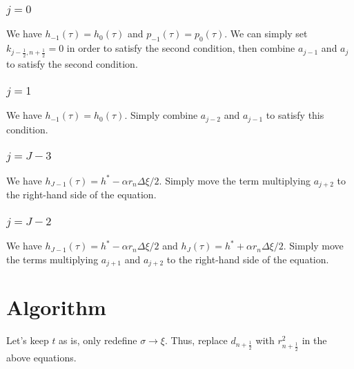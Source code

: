 \documentclass[12pt]{article}
\numberwithin{equation}{section}
\begin{document}
\subsubsection{$j=0$}

We have $h_{-1}(\tau) = h_{0}(\tau)$ and $p_{-1}(\tau) = p_0(\tau)$. We can simply set $k_{j-\frac{1}{2},n+\frac{1}{2}} = 0$  in order to satisfy the second condition, then combine $a_{j-1}$ and $a_j$ to satisfy the second condition.


\subsubsection{$j=1$}

We have $h_{-1}(\tau) = h_{0}(\tau)$. Simply combine $a_{j-2}$ and $a_{j-1}$ to satisfy this condition.

\subsubsection{$j=J-3$}

We have $h_{J-1}(\tau) = h^* - \alpha r_n \Delta \xi / 2$. Simply move the term multiplying $a_{j+2}$ to the right-hand side of the equation.


\subsubsection{$j=J-2$}


We have $h_{J-1}(\tau) = h^* - \alpha r_n \Delta \xi / 2$ and $h_{J}(\tau) = h^* + \alpha r_n \Delta \xi / 2$. Simply move the terms multiplying $a_{j+1}$ and $a_{j+2}$ to the right-hand side of the equation.


\pagebreak

\section{Algorithm}

Let's keep $t$ as is, only redefine $\sigma \rightarrow \xi$. Thus, replace $d_{n+\frac{1}{2}}$ with $r_{n+\frac{1}{2}}^2$ in the above equations.
\end{document}
